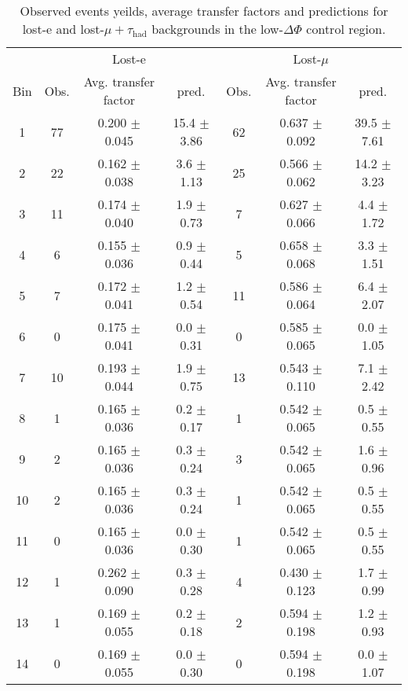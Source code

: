 \begin{table}[h!]
\centering
\caption{Observed events yeilds, average transfer factors and predictions for lost-e and 
lost-$\mu+\tau_{\text{had}}$ backgrounds in the low-$\Delta\Phi$ control region.}
\label{tab:lostLeptonPredictions_LDP}
\begin{tabular}{c|c|c|c|c|c|c}
\hline
     &  \multicolumn{3}{c}{Lost-e} & \multicolumn{3}{c}{Lost-$\mu$} \\\cline{2-7}
Bin & Obs. & Avg. transfer factor & pred. & Obs. & Avg. transfer factor &  pred. \\ 
\hline \hline
1 & 77  & 0.200  $\pm$  0.045  & 15.4 $\pm$ 3.86 & 62  & 0.637  $\pm$  0.092  & 39.5 $\pm$ 7.61    \\\hline
2 & 22  & 0.162  $\pm$  0.038  & 3.6 $\pm$ 1.13 & 25  & 0.566  $\pm$  0.062  & 14.2 $\pm$ 3.23    \\\hline
3 & 11  & 0.174  $\pm$  0.040  & 1.9 $\pm$ 0.73 & 7  & 0.627  $\pm$  0.066  & 4.4 $\pm$ 1.72    \\\hline
4 & 6  & 0.155  $\pm$  0.036  & 0.9 $\pm$ 0.44 & 5  & 0.658  $\pm$  0.068  & 3.3 $\pm$ 1.51    \\\hline
5 & 7  & 0.172  $\pm$  0.041  & 1.2 $\pm$ 0.54 & 11  & 0.586  $\pm$  0.064  & 6.4 $\pm$ 2.07    \\\hline
6 & 0  & 0.175  $\pm$  0.041  & 0.0 $\pm$ 0.31 & 0  & 0.585  $\pm$  0.065  & 0.0 $\pm$ 1.05    \\\hline
7 & 10  & 0.193  $\pm$  0.044  & 1.9 $\pm$ 0.75 & 13  & 0.543  $\pm$  0.110  & 7.1 $\pm$ 2.42    \\\hline
8 & 1  & 0.165  $\pm$  0.036  & 0.2 $\pm$ 0.17 & 1  & 0.542  $\pm$  0.065  & 0.5 $\pm$ 0.55    \\\hline
9 & 2  & 0.165  $\pm$  0.036  & 0.3 $\pm$ 0.24 & 3  & 0.542  $\pm$  0.065  & 1.6 $\pm$ 0.96    \\\hline
10 & 2  & 0.165  $\pm$  0.036  & 0.3 $\pm$ 0.24 & 1  & 0.542  $\pm$  0.065  & 0.5 $\pm$ 0.55    \\\hline
11 & 0  & 0.165  $\pm$  0.036  & 0.0 $\pm$ 0.30 & 1  & 0.542  $\pm$  0.065  & 0.5 $\pm$ 0.55    \\\hline
12 & 1  & 0.262  $\pm$  0.090  & 0.3 $\pm$ 0.28 & 4  & 0.430  $\pm$  0.123  & 1.7 $\pm$ 0.99    \\\hline
13 & 1  & 0.169  $\pm$  0.055  & 0.2 $\pm$ 0.18 & 2  & 0.594  $\pm$  0.198  & 1.2 $\pm$ 0.93    \\\hline
14 & 0  & 0.169  $\pm$  0.055  & 0.0 $\pm$ 0.30 & 0  & 0.594  $\pm$  0.198  & 0.0 $\pm$ 1.07    \\\hline

\end{tabular}
\end{table}

